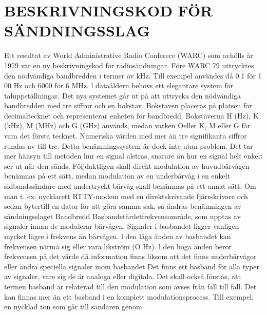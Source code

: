 \chapter{BESKRIVNINGSKOD FÖR SÄNDNINGSSLAG}

Ett resultat av World Administrative Radio
Conferece (WARC) som avhölls år 1979 var
en ny beskrivningskod för radiosändningar.
Före WARC 79 uttrycktes den nödvändiga bandbredden i termer av kHz. Till exempel användes då 0.1 för 1 00 Hz och 6000 för
6 MHz.
l dataåldern behövs ett elegantare system för taluppställningar. Det nya systemet
går ut på att uttrycka den nödvändiga bandbredden med tre siffror och en bokstav.
Bokstaven placeras på platsen för decimaltecknet och representerar enheten för bandbredd. Bokstäverna H (Hz), K (kHz), M (MHz)
och G (GHz) används, medan varken Oeller
K, M eller G får vara det första tecknet.
Numeriska värden med mer än tre signifikanta siffror rundas av till tre.
Detta benämningssystem är dock inte
utan problem. Det tar mer hänsyn till metoden hur en signal alstras, snarare än hur en
signal helt enkelt ser ut när den sänds.
Följdaktligen skall direkt modulation av
huvudbärvågen benämnas på ett sätt, medan
modulation av en underbärvåg i en enkelt
sidbandssändare med undertryckt bärvåg
skall benämnas på ett annat sätt. Om man
t. ex. nycklarett RTTY-modem med en direktskrivande fjärrskrivare och sedan bytertill en
dator för att göra samma sak, så ändras
benämningen av sändningsslaget
Bandbredd
Basbandetärdetfrekvensområde, som upptas av signaler innan de modulerar bärvågen. Signaler i basbandet ligger vanligen
mycket lägre i frekvens än bärvågen. l den
låga änden av basbandet kan frekvensen
närma sig eller vara likström (O Hz). l den
höga änden beror frekvensen på det värde
då information finns liksom att det finns underbärvågor eller andra speciella signaler
inom basbandet Det finns ett basband för
alla typer av signaler, vare sig de är analoga
eller digitala. Det skall också förstås, att
termen basband är relaterad till den modulation som avses från fall till fall.
Det kan finnas mer än ett basband i en
komplett modulationsprocess. Till exempel,
en nycklad ton som går till sändaren genom

